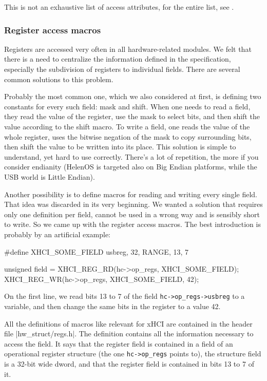 This is not an exhaustive list of access attributes, for the entire list, see .

\subsubsection{Register access macros}

Registers are accessed very often in all hardware-related modules. We felt that
there is a need to centralize the information defined in the specification,
especially the subdivision of registers to individual fields. There are several
common solutions to this problem.

Probably the most common one, which we also considered at first, is defining
two constants for every such field: mask and shift. When one needs to read
a field, they read the value of the register, use the mask to select bits, and
then shift the value according to the shift macro. To write a field, one reads
the value of the whole register, uses the bitwise negation of the mask to copy
surrounding bits, then shift the value to be written into its place. This
solution is simple to understand, yet hard to use correctly. There's a lot of
repetition, the more if you consider endianity (HelenOS is targeted also on Big
Endian platforms, while the USB world is Little Endian).

Another possibility is to define macros for reading and writing every single
field. That idea was discarded in its very beginning. We wanted a solution
that requires only one definition per field, cannot be used in a wrong way and
is sensibly short to write. So we came up with the register access macros. The
best introduction is probably by an artificial example:

\begin{listing}[h]
\begin{code}
#define XHCI_SOME_FIELD            usbreg, 32, RANGE, 13, 7

unsigned field = XHCI_REG_RD(hc->op_regs, XHCI_SOME_FIELD);
XHCI_REG_WR(hc->op_regs, XHCI_SOME_FIELD, 42);
\end{code}
	\caption[An example of using register macros]{On the first line, we read
	bits 13 to 7 of the field \texttt{hc->op_regs->usbreg} to
	a variable, and then change the same bits in the register to a value 42.}
\end{listing}

All the definitions of macros like  relevant for xHCI
are contained in the header file \header|hw_struct/regs.h|. The definition
contains all the information necessary to access the field. It says that the
register field is contained in a field  of an operational
register structure (the one \texttt{hc->op_regs} points to), the
structure field is a 32-bit wide dword, and that the register field is
contained in bits 13 to 7 of it.

